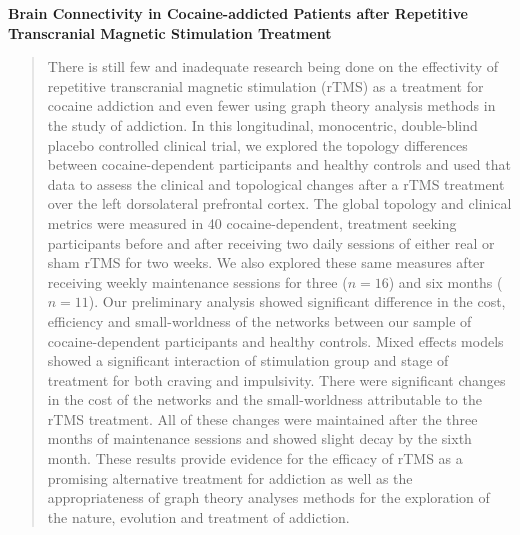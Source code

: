 \begin{center}
    \large\textbf{Brain Connectivity in Cocaine-addicted Patients after Repetitive Transcranial Magnetic Stimulation Treatment}
\end{center}
\begin{quotation}
    \noindent
There is still few and inadequate research being done on the effectivity of repetitive transcranial magnetic stimulation (rTMS) as a treatment for cocaine addiction and even fewer using graph theory analysis methods in the study of addiction. In this longitudinal, monocentric, double-blind placebo controlled clinical trial, we explored the topology differences between cocaine-dependent participants and healthy controls and used that data to assess the clinical and topological changes after a rTMS treatment over the left dorsolateral prefrontal cortex. The global topology and clinical metrics were measured in 40 cocaine-dependent, treatment seeking participants before and after receiving two daily sessions of either real or sham rTMS for two weeks. We also explored these same measures after receiving weekly maintenance sessions for three ($n=16$) and  six months ($n=11$). Our preliminary analysis showed significant difference in the cost, efficiency and small-worldness of the networks between our sample of cocaine-dependent participants and healthy controls. Mixed effects models showed a significant interaction of stimulation group and stage of treatment for both craving and impulsivity. There were significant changes in the cost of the networks and the small-worldness attributable to the rTMS treatment. All of these changes were maintained after the three months of maintenance sessions and showed slight decay by the sixth month. These results provide evidence for the efficacy of rTMS as a promising alternative treatment for addiction as well as the appropriateness of graph theory analyses methods for the exploration of the nature, evolution and treatment of addiction.
\end{quotation}
\clearpage
{}
